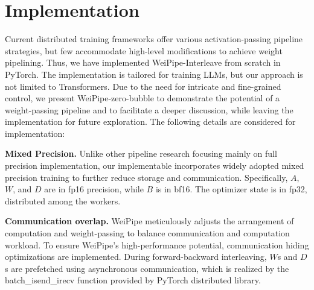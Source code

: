 \documentclass[sigplan,screen]{acmart}
\begin{document}

\section{Implementation} 

Current distributed training frameworks offer various activation-passing pipeline strategies, but few accommodate high-level modifications to achieve weight pipelining. Thus, we have implemented WeiPipe-Interleave from scratch in PyTorch\cite{pytorch}. The implementation is tailored for training LLMs, but our approach is not limited to Transformers. Due to the need for intricate and fine-grained control, we present WeiPipe-zero-bubble to demonstrate the potential of a weight-passing pipeline and to facilitate a deeper discussion, while leaving the implementation for future exploration. The following details are considered for implementation:

\textbf{Mixed Precision.} Unlike other pipeline research focusing mainly on full precision implementation, our implementable incorporates widely adopted mixed precision training to further reduce storage and communication. Specifically, $A$, $W$, and $D$ are in fp16 precision, while $B$ is in bf16. The optimizer state is in fp32, distributed among the workers.




\textbf{Communication overlap.} WeiPipe meticulously adjusts the arrangement of computation and weight-passing to balance communication and computation workload. To ensure WeiPipe's high-performance potential, communication hiding optimizations are implemented. During forward-backward interleaving, $W$s and $D$s are prefetched using asynchronous communication, which is realized by the batch\_isend\_irecv function provided by PyTorch distributed library.
\end{document}

